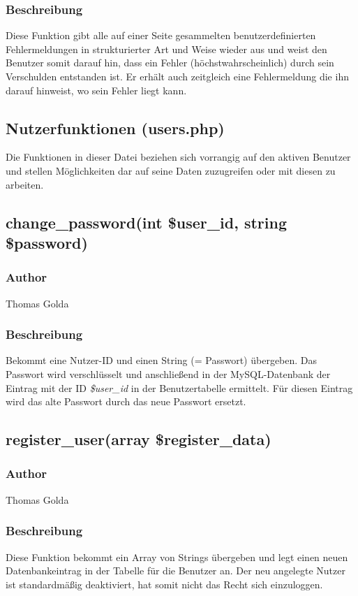 \documentclass[fontsize = 12pt, paper = a4]{scrreprt}
\begin{document}
\subsubsection*{Beschreibung}
Diese Funktion gibt alle auf einer Seite gesammelten benutzerdefinierten Fehlermeldungen in strukturierter Art und Weise wieder aus und weist den Benutzer somit darauf hin, dass ein Fehler (höchstwahrscheinlich) durch sein Verschulden entstanden ist. Er erhält auch zeitgleich eine Fehlermeldung die ihn darauf hinweist, wo sein Fehler liegt kann.

\newpage


\subsection{Nutzerfunktionen (users.php)}
Die Funktionen in dieser Datei beziehen sich vorrangig auf den aktiven Benutzer und stellen Möglichkeiten dar auf seine Daten zuzugreifen oder mit diesen zu arbeiten.
\subsection*{change\_password(int \$user\_id, string \$password)}
\subsubsection*{Author}
Thomas Golda
\subsubsection*{Beschreibung}
Bekommt eine Nutzer-ID und einen String (= Passwort) übergeben. Das Passwort wird verschlüsselt und anschließend in der MySQL-Datenbank der Eintrag mit der ID \textit{\$user\_id} in der Benutzertabelle ermittelt. Für diesen Eintrag wird das alte Passwort durch das neue Passwort ersetzt.


\subsection*{register\_user(array \$register\_data)}
\subsubsection*{Author}
Thomas Golda
\subsubsection*{Beschreibung}
Diese Funktion bekommt ein Array von Strings übergeben und legt einen neuen Datenbankeintrag in der Tabelle für die Benutzer an.
Der neu angelegte Nutzer ist standardmäßig deaktiviert, hat somit nicht das Recht sich einzuloggen.
\end{document}
